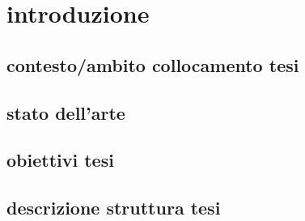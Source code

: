 \section{introduzione}

\subsection{contesto/ambito collocamento tesi}

\subsection{stato dell'arte}

\subsection{obiettivi tesi}

\subsection{descrizione struttura tesi}